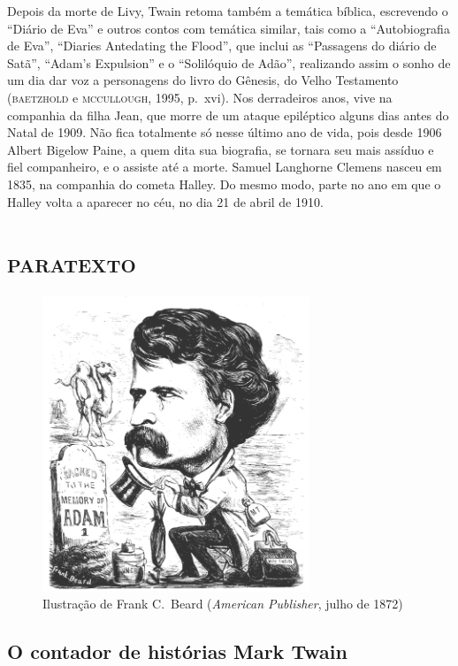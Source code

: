 Depois da morte de Livy, Twain retoma também a temática bíblica, escrevendo o
``Diário de Eva'' e outros contos com temática similar, tais como a
“Autobiografia de Eva”, “Diaries Antedating the Flood”, que inclui as
“Passagens do diário de Satã”, “Adam’s Expulsion” e o “Solilóquio de Adão”,
realizando assim o sonho de um dia dar voz a personagens do
livro do Gênesis, do Velho Testamento (\textsc{baetzhold} e \textsc{mccullough}, 1995, p.~xvi).
Nos derradeiros anos, vive na companhia da filha Jean, que morre de um ataque
epiléptico alguns dias antes do Natal de 1909. Não fica totalmente só
nesse último ano de vida, pois desde 1906 Albert Bigelow Paine, a quem
dita sua biografia, se tornara seu mais assíduo e fiel companheiro, e o
assiste até a morte. Samuel Langhorne Clemens nasceu em 1835, na companhia
do cometa Halley. Do mesmo modo, parte no ano em que o Halley volta a
aparecer no céu, no dia 21 de abril de 1910.


\part{\textsc{paratexto}}

\thispagestyle{empty}
\begin{figure}\begin{center}
	\includegraphics[width=8cm]{img1.png}
	\caption{Ilustração de Frank C.~Beard (\emph{American Publisher}, julho de 1872)}
\end{center}\end{figure}%

\chapter{O contador de histórias Mark Twain}

